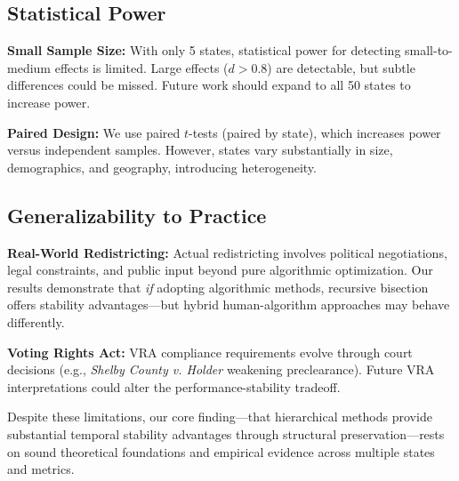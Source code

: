 \subsection{Statistical Power}

\textbf{Small Sample Size:} With only 5 states, statistical power for detecting small-to-medium effects is limited. Large effects ($d>0.8$) are detectable, but subtle differences could be missed. Future work should expand to all 50 states to increase power.

\textbf{Paired Design:} We use paired $t$-tests (paired by state), which increases power versus independent samples. However, states vary substantially in size, demographics, and geography, introducing heterogeneity.

\subsection{Generalizability to Practice}

\textbf{Real-World Redistricting:} Actual redistricting involves political negotiations, legal constraints, and public input beyond pure algorithmic optimization. Our results demonstrate that \emph{if} adopting algorithmic methods, recursive bisection offers stability advantages—but hybrid human-algorithm approaches may behave differently.

\textbf{Voting Rights Act:} VRA compliance requirements evolve through court decisions (e.g., \emph{Shelby County v. Holder} weakening preclearance). Future VRA interpretations could alter the performance-stability tradeoff.

Despite these limitations, our core finding—that hierarchical methods provide substantial temporal stability advantages through structural preservation—rests on sound theoretical foundations and empirical evidence across multiple states and metrics.
